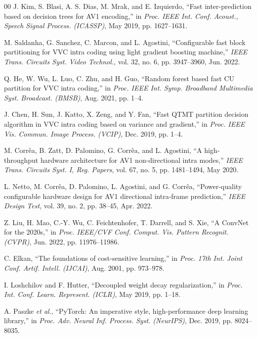 \documentclass[conference]{IEEEtran}
\begin{document}
\begin{thebibliography}{00}
 J. Kim, S. Blasi, A. S. Dias, M. Mrak, and E. Izquierdo, ``Fast inter-prediction based on decision trees for AV1 encoding,'' in \emph{Proc. IEEE Int. Conf. Acoust., Speech Signal Process. (ICASSP)}, May 2019, pp. 1627--1631.

 M. Saldanha, G. Sanchez, C. Marcon, and L. Agostini, ``Configurable fast block partitioning for VVC intra coding using light gradient boosting machine,'' \emph{IEEE Trans. Circuits Syst. Video Technol.}, vol. 32, no. 6, pp. 3947--3960, Jun. 2022.

 Q. He, W. Wu, L. Luo, C. Zhu, and H. Guo, ``Random forest based fast CU partition for VVC intra coding,'' in \emph{Proc. IEEE Int. Symp. Broadband Multimedia Syst. Broadcast. (BMSB)}, Aug. 2021, pp. 1--4.

 J. Chen, H. Sun, J. Katto, X. Zeng, and Y. Fan, ``Fast QTMT partition decision algorithm in VVC intra coding based on variance and gradient,'' in \emph{Proc. IEEE Vis. Commun. Image Process. (VCIP)}, Dec. 2019, pp. 1--4.

 M. Corr\^ea, B. Zatt, D. Palomino, G. Corr\^ea, and L. Agostini, ``A high-throughput hardware architecture for AV1 non-directional intra modes,'' \emph{IEEE Trans. Circuits Syst. I, Reg. Papers}, vol. 67, no. 5, pp. 1481--1494, May 2020.

 L. Netto, M. Corr\^ea, D. Palomino, L. Agostini, and G. Corr\^ea, ``Power-quality configurable hardware design for AV1 directional intra-frame prediction,'' \emph{IEEE Design Test}, vol. 39, no. 2, pp. 38--45, Apr. 2022.

 Z. Liu, H. Mao, C.-Y. Wu, C. Feichtenhofer, T. Darrell, and S. Xie, ``A ConvNet for the 2020s,'' in \emph{Proc. IEEE/CVF Conf. Comput. Vis. Pattern Recognit. (CVPR)}, Jun. 2022, pp. 11976--11986.

 C. Elkan, ``The foundations of cost-sensitive learning,'' in \emph{Proc. 17th Int. Joint Conf. Artif. Intell. (IJCAI)}, Aug. 2001, pp. 973--978.

 I. Loshchilov and F. Hutter, ``Decoupled weight decay regularization,'' in \emph{Proc. Int. Conf. Learn. Represent. (ICLR)}, May 2019, pp. 1--18.

 A. Paszke \emph{et al.}, ``PyTorch: An imperative style, high-performance deep learning library,'' in \emph{Proc. Adv. Neural Inf. Process. Syst. (NeurIPS)}, Dec. 2019, pp. 8024--8035.


\end{thebibliography}
\end{document}
